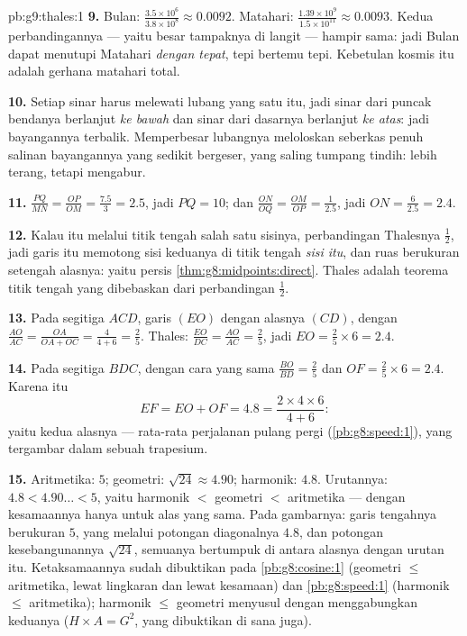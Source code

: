 \begin{solution}{pb:g9:thales:1}
\textbf{9.} Bulan: $\frac{3.5 \times 10^6}{3.8 \times 10^8}
\approx 0.0092$. Matahari: $\frac{1.39 \times 10^9}{1.5 \times
10^{11}} \approx 0.0093$. Kedua perbandingannya --- yaitu besar
tampaknya di langit --- hampir sama: jadi Bulan dapat menutupi
Matahari \emph{dengan tepat}, tepi bertemu tepi. Kebetulan kosmis itu
adalah gerhana matahari total.

\textbf{10.} Setiap sinar harus melewati lubang yang satu itu, jadi
sinar dari puncak bendanya berlanjut \emph{ke bawah} dan sinar dari
dasarnya berlanjut \emph{ke atas}: jadi bayangannya terbalik.
Memperbesar lubangnya meloloskan seberkas penuh salinan bayangannya
yang sedikit bergeser, yang saling tumpang tindih: lebih terang,
tetapi mengabur.

\textbf{11.} $\frac{PQ}{MN} = \frac{OP}{OM} = \frac{7.5}{3}
= 2.5$, jadi $PQ = 10$; dan $\frac{ON}{OQ} = \frac{OM}{OP} =
\frac{1}{2.5}$, jadi $ON = \frac{6}{2.5} = 2.4$.

\textbf{12.} Kalau  itu melalui titik tengah salah satu
sisinya, perbandingan Thalesnya $\frac12$, jadi garis itu memotong
sisi keduanya di titik tengah \emph{sisi itu}, dan ruas  berukuran setengah alasnya: yaitu persis
\cref{thm:g8:midpoints:direct}. Thales adalah teorema titik tengah
yang dibebaskan dari perbandingan $\frac12$.

\textbf{13.} Pada segitiga $ACD$, garis $(EO)$ 
dengan alasnya $(CD)$, dengan $\frac{AO}{AC} = \frac{OA}{OA + OC} =
\frac{4}{4 + 6} = \frac25$. Thales:
$\frac{EO}{DC} = \frac{AO}{AC} = \frac25$, jadi
$EO = \frac25 \times 6 = 2.4$.

\textbf{14.} Pada segitiga $BDC$, dengan cara yang sama
$\frac{BO}{BD} = \frac25$ dan $OF = \frac25 \times 6 = 2.4$.
Karena itu
\[
EF = EO + OF = 4.8
= \frac{2 \times 4 \times 6}{4 + 6} :
\]
yaitu  kedua alasnya --- rata-rata perjalanan pulang
pergi (\cref{pb:g8:speed:1}), yang tergambar dalam sebuah trapesium.

\textbf{15.} Aritmetika: $5$; geometri:
$\sqrt{24} \approx 4.90$; harmonik: $4.8$. Urutannya:
$4.8 < 4.90\ldots < 5$, yaitu harmonik $<$ geometri $<$
aritmetika --- dengan kesamaannya hanya untuk alas yang sama. Pada
gambarnya: garis tengahnya berukuran $5$,  yang melalui
potongan diagonalnya $4.8$, dan potongan kesebangunannya
$\sqrt{24}$, semuanya bertumpuk di antara alasnya dengan urutan itu.
Ketaksamaannya sudah dibuktikan pada \cref{pb:g8:cosine:1} (geometri
$\leq$ aritmetika, lewat lingkaran dan lewat kesamaan) dan
\cref{pb:g8:speed:1} (harmonik $\leq$ aritmetika); harmonik
$\leq$ geometri menyusul dengan menggabungkan keduanya
($H \times A = G^2$, yang dibuktikan di sana juga).

\end{solution}
